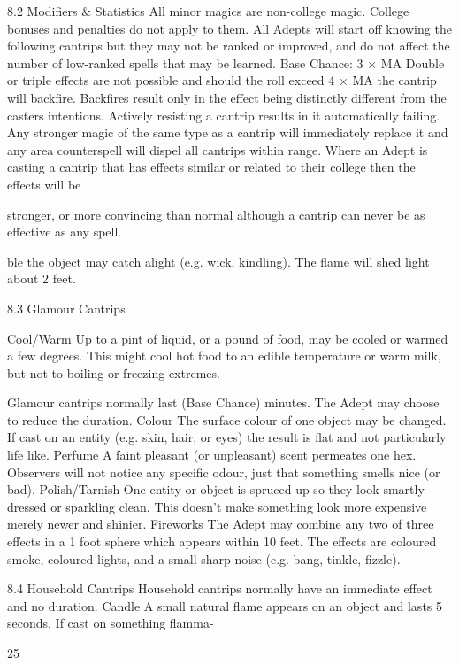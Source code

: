 \documentclass[a4paper]{article}
\begin{document}
\begin{multicols}{3}
8.2 Modifiers & Statistics
All minor magics are non-college magic. College
bonuses and penalties do not apply to them. All
Adepts will start off knowing the following cantrips but they may not be ranked or improved, and
do not affect the number of low-ranked spells that
may be learned.
Base Chance: 3 × MA
Double or triple effects are not possible and should
the roll exceed 4 × MA the cantrip will backfire.
Backfires result only in the effect being distinctly
different from the casters intentions. Actively
resisting a cantrip results in it automatically failing.
Any stronger magic of the same type as a cantrip
will immediately replace it and any area counterspell will dispel all cantrips within range. Where an
Adept is casting a cantrip that has effects similar or
related to their college then the effects will be

stronger, or more convincing than normal although
a cantrip can never be as effective as any spell.

ble the object may catch alight (e.g. wick, kindling). The flame will shed light about 2 feet.

8.3 Glamour Cantrips

Cool/Warm Up to a pint of liquid, or a pound of
food, may be cooled or warmed a few degrees.
This might cool hot food to an edible temperature
or warm milk, but not to boiling or freezing extremes.

Glamour cantrips normally last (Base Chance)
minutes. The Adept may choose to reduce the
duration.
Colour The surface colour of one object may be
changed. If cast on an entity (e.g. skin, hair, or
eyes) the result is flat and not particularly life like.
Perfume A faint pleasant (or unpleasant) scent
permeates one hex. Observers will not notice any
specific odour, just that something smells nice (or
bad).
Polish/Tarnish One entity or object is spruced up
so they look smartly dressed or sparkling clean.
This doesn’t make something look more expensive
merely newer and shinier.
Fireworks The Adept may combine any two of
three effects in a 1 foot sphere which appears
within 10 feet. The effects are coloured smoke,
coloured lights, and a small sharp noise (e.g. bang,
tinkle, fizzle).

8.4 Household Cantrips
Household cantrips normally have an immediate
effect and no duration.
Candle A small natural flame appears on an object
and lasts 5 seconds. If cast on something flamma-

25


\end{multicols}
\end{document}
